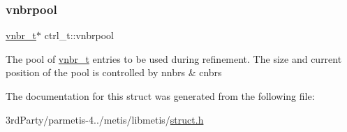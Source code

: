 \subsubsection{\texorpdfstring{vnbrpool}{vnbrpool}}
{\footnotesize\ttfamily \hyperlink{structvnbr__t}{vnbr\+\_\+t}$\ast$ ctrl\+\_\+t\+::vnbrpool}

The pool of \hyperlink{structvnbr__t}{vnbr\+\_\+t} entries to be used during refinement. The size and current position of the pool is controlled by nnbrs \& cnbrs 

The documentation for this struct was generated from the following file\+:\begin{DoxyCompactItemize}
\item 
3rd\+Party/parmetis-\/4../metis/libmetis/\hyperlink{metis_2libmetis_2struct_8h}{struct.\+h}\end{DoxyCompactItemize}
